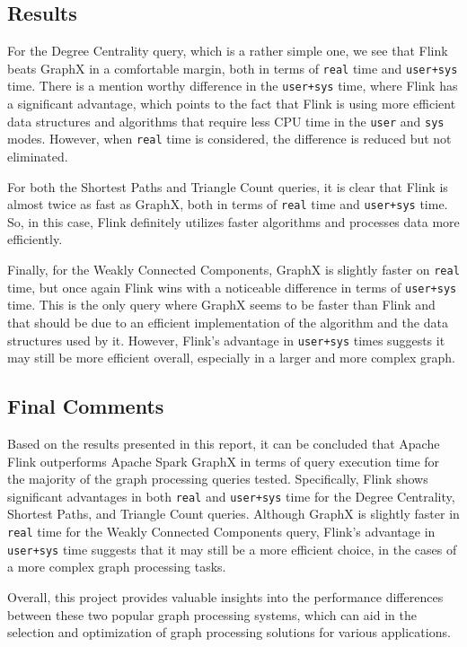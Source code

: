 \documentclass[conference]{IEEEtran}
\begin{document}
\subsection{Results}

For the Degree Centrality query, which is a rather simple one, we see that Flink beats GraphX in a comfortable margin, both in terms of \verb|real| time and \verb|user+sys| time. There is a mention worthy difference in the \verb|user+sys| time, where Flink has a significant advantage, which points to the fact that Flink is using more efficient data structures and algorithms that require less CPU time in the \verb|user| and \verb|sys| modes. However, when \verb|real| time is considered, the difference is reduced but not eliminated.

For both the Shortest Paths and Triangle Count queries, it is clear that Flink is almost twice as fast as GraphX, both in terms of \verb|real| time and \verb|user+sys| time. So, in this case, Flink definitely utilizes faster algorithms and processes data more efficiently.

Finally, for the Weakly Connected Components, GraphX is slightly faster on \verb|real| time, but once again Flink wins with a noticeable difference in terms of \verb|user+sys| time. This is the only query where GraphX seems to be faster than Flink and that should be due to an efficient implementation of the algorithm and the data structures used by it. However, Flink's advantage in \verb|user+sys| times suggests it may still be more efficient overall, especially in a larger and more complex graph.

\subsection{Final Comments}

Based on the results presented in this report, it can be concluded that Apache Flink outperforms Apache Spark GraphX in terms of query execution time for the majority of the graph processing queries tested. Specifically, Flink shows significant advantages in both \verb|real| and \verb|user+sys| time for the Degree Centrality, Shortest Paths, and Triangle Count queries. Although GraphX is slightly faster in \verb|real| time for the Weakly Connected Components query, Flink's advantage in \verb|user+sys| time suggests that it may still be a more efficient choice, in the cases of a more complex graph processing tasks. 

Overall, this project provides valuable insights into the performance differences between these two popular graph processing systems, which can aid in the selection and optimization of graph processing solutions for various applications.
\end{document}
